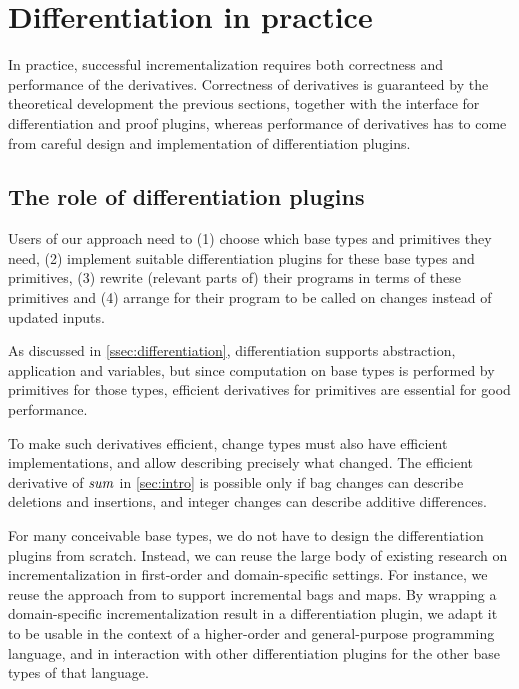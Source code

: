 \section{Differentiation in practice}
\label{sec:applying}

In practice, successful incrementalization requires both
correctness and performance of the derivatives. Correctness of
derivatives is guaranteed by the theoretical development the
previous sections, together with the interface for
differentiation and proof plugins, whereas performance of
derivatives has to come from careful design and implementation of
differentiation plugins.

\subsection{The role of differentiation plugins}
\label{ssec:methodology}
Users of our approach need to
%
(1) choose which base types and primitives they need,
%
(2) implement suitable differentiation plugins for these base
types and primitives,
%
(3) rewrite (relevant parts of) their programs in terms of these primitives and
%
(4) arrange for their program to be called on changes instead of
updated inputs.

As discussed in \cref{ssec:differentiation}, differentiation
supports abstraction, application and variables, but since
computation on base types is performed by primitives for those
types, efficient derivatives for primitives are essential for
good performance.

To make such derivatives efficient, change
types must also have efficient implementations, and allow
describing precisely what changed. The efficient derivative of
$\mathit{sum}$ in \cref{sec:intro} is possible only if bag changes
can describe deletions and insertions, and integer changes can
describe additive differences.

For many conceivable base types, we do not have to design the
differentiation plugins from scratch. Instead, we can reuse the
large body of existing research on incrementalization in
first-order and domain-specific settings. For instance, we reuse
the approach from \citet{GlucheGrust97Incr} to support incremental
bags and maps. By wrapping a
domain-specific incrementalization result in a differentiation
plugin, we adapt it to be usable in the context of a higher-order
and general-purpose programming language, and in interaction with
other differentiation plugins for the other base types of that
language.

